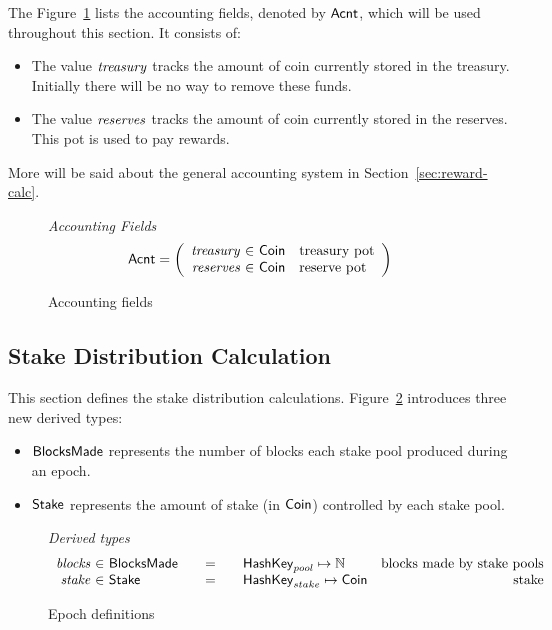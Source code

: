 The Figure~\ref{fig:defs:accounting} lists the accounting fields, denoted by $\mathsf{Acnt}$,
which will be used throughout this section. It consists of:
\begin{itemize}
  \item The value $\mathit{treasury}$ tracks the amount of coin currently stored in the treasury.
    Initially there will be no way to remove these funds.
  \item The value $\mathit{reserves}$ tracks the amount of coin currently stored in the reserves.
    This pot is used to pay rewards.
\end{itemize}
More will be said about the general accounting system in Section~\ref{sec:reward-calc}.

\begin{figure}[htb]
  \emph{Accounting Fields}
  \begin{equation*}
    \Acnt =
    \left(
      \begin{array}{r@{~\in~}ll}
        \var{treasury} & \Coin & \text{treasury pot}\\
        \var{reserves} & \Coin & \text{reserve pot}\\
      \end{array}
    \right)
  \end{equation*}
  \caption{Accounting fields}
  \label{fig:defs:accounting}
\end{figure}


\subsection{Stake Distribution Calculation}
\label{sec:stake-dist-calc}

This section defines the stake distribution calculations.
Figure~\ref{fig:epoch-defs} introduces three new derived types:
\begin{itemize}
  \item $\mathsf{BlocksMade}$ represents the number of blocks each stake pool produced
    during an epoch.
  \item $\mathsf{Stake}$ represents the amount of stake (in $\mathsf{Coin}$) controlled by each
    stake pool.
\end{itemize}

\begin{figure}[htb]
  \emph{Derived types}
  \begin{equation*}
    \begin{array}{r@{~\in~}l@{\qquad=\qquad}lr}
      \var{blocks}
      & \BlocksMade
      & \HashKey_{pool} \mapsto \N
      & \text{blocks made by stake pools} \\
      \var{stake}
      & \Stake
      & \HashKey_{stake} \mapsto \Coin
      & \text{stake} \\
    \end{array}
  \end{equation*}
  \caption{Epoch definitions}
  \label{fig:epoch-defs}
\end{figure}

